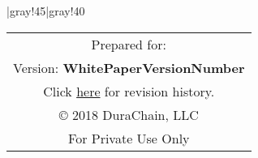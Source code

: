 \vfill
\begin{center}
\tabulinesep=2mm
  \taburulecolor |{gray!45}|{gray!40} \arrayrulewidth=1pt
\begin{tabu}{||c||}
  \hline \hline
  Prepared for: \\
  \small{Version:} \textbf{WhitePaperVersionNumber} \\
	\small
  Click {\href{https://github.com/durachain/whitepaper/commits/master}{here} for revision history.} \\
  \copyright\hspace{.25em} 2018 DuraChain, LLC\\
  For Private Use Only \\ \hline \hline
\end{tabu}

\end{center}
\vfill
